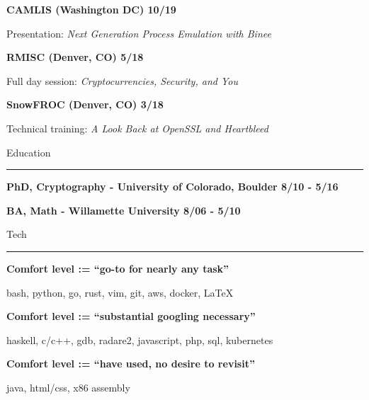 \documentclass{letter}
\begin{document}
\textbf{CAMLIS (Washington DC) \hfill 10/19}

Presentation: \textit{Next Generation Process Emulation with Binee}

\textbf{RMISC (Denver, CO) \hfill 5/18}

Full day session: \textit{Cryptocurrencies, Security, and You}

\textbf{SnowFROC (Denver, CO) \hfill 3/18}

Technical training: \textit{A Look Back at OpenSSL and Heartbleed}

\vspc

\large{Education}
\vskip1mm
\hrule

\textbf{PhD, Cryptography - University of Colorado, Boulder \hfill 8/10 - 5/16}

\textbf{BA, Math - Willamette University \hfill 8/06 - 5/10}

\vspc

\large{Tech}
\vskip1mm
\hrule

\textbf{Comfort level := ``go-to for nearly any task''}

bash, python, go, rust, vim, git, aws, docker, \LaTeX

\vspc

\textbf{Comfort level := ``substantial googling necessary''}

haskell, c/c++, gdb, radare2, javascript, php, sql, kubernetes

\vspc

\textbf{Comfort level := ``have used, no desire to revisit''}

java, html/css, x86 assembly
\end{document}
